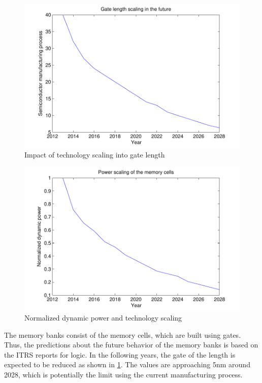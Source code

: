 \begin{figure}
 \centering
 \includegraphics[width = \textwidth]{E/gate.pdf}
  \caption{Impact of technology scaling into gate length}
 \label{fig:gateE}
 \end{figure}
 
  \begin{figure}
 \centering
 \includegraphics[width = \textwidth]{E/cellpower.pdf}
  \caption{Normalized dynamic power and technology scaling}
 \label{fig:powerE}
 \end{figure}
 
The memory banks consist of the memory cells, which are built using gates.
Thus, the predictions about the future behavior of the memory banks is based on the ITRS reports for logic.
In the following years, the gate of the length is expected to be reduced as shown in \ref{fig:gateE}.
The values are approaching 5nm around 2028, which is potentially the limit using the current manufacturing process.

